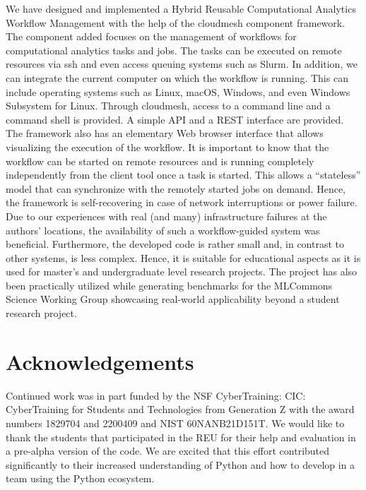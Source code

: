 We have designed and implemented a Hybrid Reusable Computational
Analytics Workflow Management with the help of the cloudmesh component
framework. The component added focuses on the management of workflows
for computational analytics tasks and jobs. The tasks can be executed
on remote resources via ssh and even access queuing systems such as
Slurm. In addition, we can integrate the current computer on which the
workflow is running. This can include operating systems such as Linux,
macOS, Windows, and even Windows Subsystem for Linux. Through
cloudmesh, access to a command line and a command shell is provided. A
simple API and a REST interface are provided. The framework also has
an elementary Web browser interface that allows visualizing the
execution of the workflow. It is important to know that the workflow
can be started on remote resources and is running completely
independently from the client tool once a task is started. This allows
a ``stateless'' model that can synchronize with the remotely started
jobs on demand. Hence, the framework is self-recovering in case of
network interruptions or power failure. Due to our experiences with
real (and many) infrastructure failures at the authors' locations, the
availability of such a workflow-guided system was
beneficial. Furthermore, the developed code is rather small and, in
contrast to other systems, is less complex. Hence, it is suitable for
educational aspects as it is used for master's and undergraduate level
research projects. The project has also been practically utilized
while generating benchmarks for the MLCommons Science Working Group
showcasing real-world applicability beyond a student research project.


% 



\section*{Acknowledgements}

Continued work was in part funded by the NSF CyberTraining: CIC:
CyberTraining for Students and Technologies from Generation Z with the
award numbers 1829704 and 2200409 and NIST 60NANB21D151T. We would like to
thank the students that participated in the REU for their help and
evaluation in a pre-alpha version of the code. We are excited that
this effort contributed significantly to their increased understanding
of Python and how to develop in a team using the Python ecosystem.

